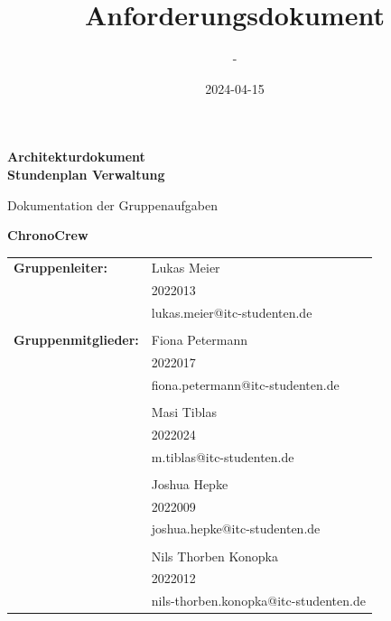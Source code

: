 \documentclass[11pt,a4paper]{article}
\title{Anforderungsdokument}
\date{2024-04-15}
\author{-}
\begin{document}
	\begin{titlepage}
		\begin{center}
			\Huge
			\textbf{Architekturdokument\\ Stundenplan Verwaltung}
			
			\vspace{0.5cm}
			\LARGE
			Dokumentation der Gruppenaufgaben
			
			\vspace{1.5cm}
			
			\textbf{ChronoCrew}
			
			\vspace{1.75cm}
			
			\vfill
			
			\vspace{1.0cm}
			\large
			\begin{tabular}{p{8cm}l}
				\textbf{Gruppenleiter:} & Lukas Meier\\
				& 2022013\\
				& lukas.meier@itc-studenten.de\\ 
				&\\
				\textbf{Gruppenmitglieder:} & Fiona Petermann\\
				& 2022017\\
				& fiona.petermann@itc-studenten.de\\
				&\\
				& Masi Tiblas\\
				& 2022024\\
				& m.tiblas@itc-studenten.de\\
				&\\
				& Joshua Hepke\\
				& 2022009\\
				& joshua.hepke@itc-studenten.de\\
				&\\
				& Nils Thorben Konopka\\
				& 2022012\\
				& nils-thorben.konopka@itc-studenten.de
			\end{tabular}
			\vfill
		\end{center}
	\end{titlepage}
	
	\newpage
	
	\setcounter{tocdepth}{2}
	\setcounter{secnumdepth}{3}
	\tableofcontents
	
	\newpage
	
	
	
	
	
	
	
\end{document}
